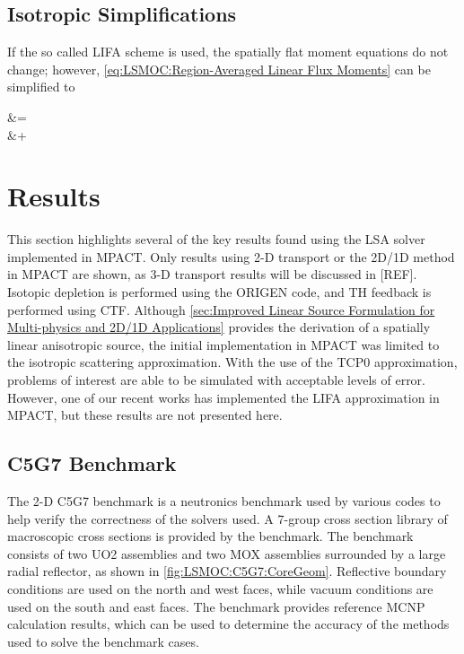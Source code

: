 {{    \subsection{Isotropic Simplifications}{\label{ssec:LSMOC:Isotropic Simplifications}
      If the so called \acf{LIFA} scheme is used, the spatially flat moment equations do not change; however, \cref{eq:LSMOC:Region-Averaged Linear Flux Moments} can be simplified to
      \begin{aequation}\label{eq:LSMOC:LIFA:Region-Averaged Linear Flux Moments}
        \MOCIntegral{\SH\loc\aflux[][g][]} &= \M\frac{\srcL}{\xst}\\ &+ \suml[m]\wt\suml[k]\tA\left[\locIn\dflux+\dirm\segl\left(\frac{\dflux}{\segopt}-\afluxout+\frac{\tsrcF}{\xst}\right)\right]
      \end{aequation}
    }
  }

  \section{Results}{\label{sec:LSMOC:Results}
    This section highlights several of the key results found using the \ac{LSA} solver implemented in MPACT.
    Only results using 2-D transport or the 2D/1D method in MPACT are shown, as 3-D transport results will be discussed in [REF].
    Isotopic depletion is performed using the ORIGEN code, and \ac{TH} feedback is performed using \ac{CTF}.
    Although \cref{sec:Improved Linear Source Formulation for Multi-physics and 2D/1D Applications} provides the derivation of a spatially linear anisotropic source, the initial implementation in MPACT was limited to the isotropic scattering approximation.
    With the use of the \ac{TCP0} approximation, problems of interest are able to be simulated with acceptable levels of error.
    However, one of our recent works \cite{Herring2020} has implemented the \ac{LIFA} approximation in MPACT, but these results are not presented here.

    \subsection{C5G7 Benchmark}{\label{ssec:LSMOC:C5G7 Benchmark}
      The 2-D C5G7 benchmark \cite{Smith2006} is a neutronics benchmark used by various codes to help verify the correctness of the solvers used.
      A 7-group cross section library of macroscopic cross sections is provided by the benchmark.
      The benchmark consists of two \ac{UO2} assemblies and two \ac{MOX} assemblies surrounded by a large radial reflector, as shown in \cref{fig:LSMOC:C5G7:CoreGeom}.
      Reflective boundary conditions are used on the north and west faces, while vacuum conditions are used on the south and east faces.
      The benchmark provides reference MCNP calculation results, which can be used to determine the accuracy of the methods used to solve the benchmark cases.

}}}
